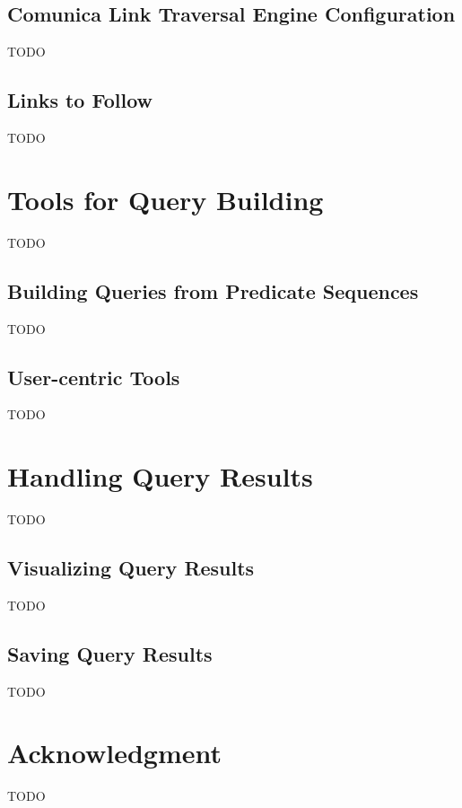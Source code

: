 \documentclass[conference]{IEEEtran}
\begin{document}
\subsection{Comunica Link Traversal Engine Configuration}
TODO

\subsection{Links to Follow}
TODO

\section{Tools for Query Building}
TODO

\subsection{Building Queries from Predicate Sequences}
TODO

\subsection{User-centric Tools}
TODO

\section{Handling Query Results}
TODO

\subsection{Visualizing Query Results}
TODO

\subsection{Saving Query Results}
TODO

\section*{Acknowledgment}
TODO

% 
% 
\end{document}
